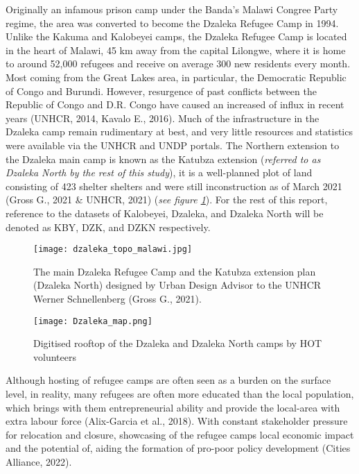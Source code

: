 \documentclass[11pt, a4paper, twoside]{report}
\begin{document}
Originally an infamous prison camp under the Banda's Malawi Congree Party regime, the area was converted to become the Dzaleka Refugee Camp in 1994. Unlike the Kakuma and Kalobeyei camps, the Dzaleka Refugee Camp is located in the heart of Malawi, 45 km away from the capital Lilongwe, where it is home to around 52,000 refugees and receive on average 300 new residents every month. Most coming from the Great Lakes area, in particular, the Democratic Republic of Congo and Burundi. However, resurgence of past conflicts between the Republic of Congo and D.R. Congo have caused an increased of influx in recent years (UNHCR, 2014, Kavalo E., 2016). Much of the infrastructure in the Dzaleka camp remain rudimentary at best, and very little resources and statistics were available via the UNHCR and UNDP portals. The Northern extension to the Dzaleka main camp is known as the Katubza extension (\textit{referred to as Dzaleka North by the rest of this study}), it is a well-planned plot of land consisting of 423 shelter shelters and were still inconstruction as of March 2021 (Gross G., 2021 \& UNHCR, 2021) (\textit{see figure \ref{fig:DZ_KA_PLAN}}). For the rest of this report, reference to the datasets of Kalobeyei, Dzaleka, and Dzaleka North will be denoted as KBY, DZK, and DZKN respectively.\\\par

\begin{figure}[H]
  \centering
  \texttt{[image: dzaleka\_topo\_malawi.jpg]}
  \caption{The main Dzaleka Refugee Camp and the Katubza extension plan (Dzaleka North) designed by Urban Design Advisor to the UNHCR Werner Schnellenberg (Gross G., 2021).}
\label{fig:DZ_KA_PLAN}
\end{figure}

\begin{figure}[H]
  \centering
  \texttt{[image: Dzaleka\_map.png]}
  \caption{Digitised rooftop of the Dzaleka and Dzaleka North camps by HOT volunteers}
\label{fig:Overview_DZK}
\end{figure}

Although hosting of refugee camps are often seen as a burden on the surface level, in reality, many refugees are often more educated than the local population, which brings with them entrepreneurial ability and provide the local-area with extra labour force (Alix-Garcia et al., 2018). With constant stakeholder pressure for relocation and closure, showcasing of the refugee camps local economic impact and the potential of, aiding the formation of pro-poor policy development (Cities Alliance, 2022).\\\par
\end{document}
